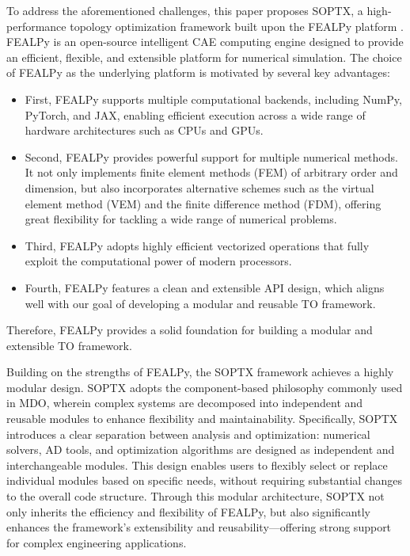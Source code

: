 \documentclass[mathpazo]{cicp}
\begin{document}
To address the aforementioned challenges, this paper proposes SOPTX, a high-performance topology optimization framework built upon the FEALPy platform \cite{fealpy}. FEALPy is an open-source intelligent CAE computing engine designed to provide an efficient, flexible, and extensible platform for numerical simulation. The choice of FEALPy as the underlying platform is motivated by several key advantages:
\begin{itemize}
	\item First, FEALPy supports multiple computational backends, including NumPy, PyTorch, and JAX, enabling efficient execution across a wide range of hardware architectures such as CPUs and GPUs.
	\item Second, FEALPy provides powerful support for multiple numerical methods. It not only implements finite element methods (FEM) of arbitrary order and dimension, but also incorporates alternative schemes such as the virtual element method (VEM) and the finite difference method (FDM), offering great flexibility for tackling a wide range of numerical problems.
	\item Third, FEALPy adopts highly efficient vectorized operations that fully exploit the computational power of modern processors.
	\item Fourth, FEALPy features a clean and extensible API design, which aligns well with our goal of developing a modular and reusable TO framework.
\end{itemize}
Therefore, FEALPy provides a solid foundation for building a modular and extensible TO framework.

Building on the strengths of FEALPy, the SOPTX framework achieves a highly modular design. SOPTX adopts the component-based philosophy commonly used in MDO, wherein complex systems are decomposed into independent and reusable modules to enhance flexibility and maintainability. Specifically, SOPTX introduces a clear separation between analysis and optimization: numerical solvers, AD tools, and optimization algorithms are designed as independent and interchangeable modules. This design enables users to flexibly select or replace individual modules based on specific needs, without requiring substantial changes to the overall code structure. Through this modular architecture, SOPTX not only inherits the efficiency and flexibility of FEALPy, but also significantly enhances the framework’s extensibility and reusability---offering strong support for complex engineering applications.
\end{document}
